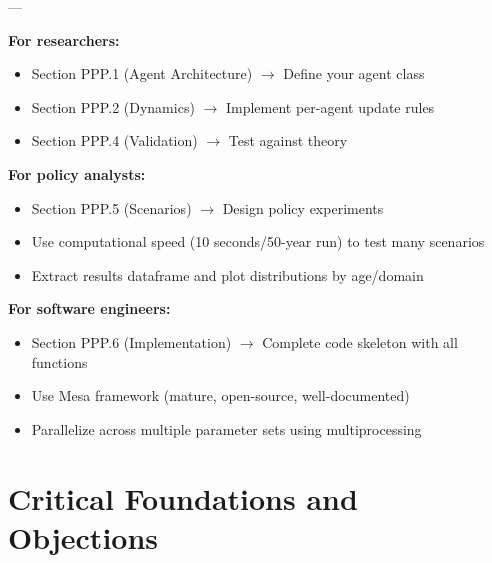 ---


\vspace{1cm}

\begin{tcolorbox}[colback=green!5!white, colframe=green!75!black, title=Using This Appendix]

\textbf{For researchers:}
\begin{itemize}[nosep]
\item Section PPP.1 (Agent Architecture) $\to$ Define your agent class
\item Section PPP.2 (Dynamics) $\to$ Implement per-agent update rules
\item Section PPP.4 (Validation) $\to$ Test against theory
\end{itemize}

\textbf{For policy analysts:}
\begin{itemize}[nosep]
\item Section PPP.5 (Scenarios) $\to$ Design policy experiments
\item Use computational speed (10 seconds/50-year run) to test many scenarios
\item Extract results dataframe and plot distributions by age/domain
\end{itemize}

\textbf{For software engineers:}
\begin{itemize}[nosep]
\item Section PPP.6 (Implementation) $\to$ Complete code skeleton with all functions
\item Use Mesa framework (mature, open-source, well-documented)
\item Parallelize across multiple parameter sets using multiprocessing
\end{itemize}

\end{tcolorbox}



\section{Critical Foundations and Objections}
\label{sec:ppp-foundations}

